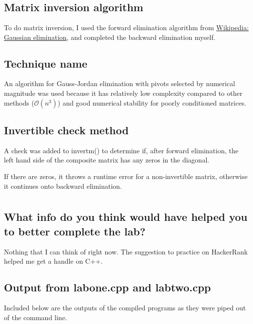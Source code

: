 \documentclass{article}
\begin{document}
\section{}
\subsection{Matrix inversion algorithm}
To do matrix inversion, I used the forward elimination algorithm from  \href{https://en.wikipedia.org/wiki/Gaussian_elimination#Pseudocode}{Wikipedia: Gaussian elimination}, and completed the backward elimination myself.
\subsection{Technique name}
An algorithm for Gauss-Jordan elimination with pivots selected by numerical magnitude was used because it has relatively low complexity compared to other methods ($\mathcal{O}(n^3)$) and good numerical stability for poorly conditioned matrices.
\subsection{Invertible check method}
A check was added to invertm() to determine if, after forward elimination, the left hand side of the composite matrix has any zeros in the diagonal.

If there are zeros, it throws a runtime error for a non-invertible matrix, otherwise it continues onto backward elimination.

\section{}
\subsection{What info do you think would have helped you to better complete the lab?}
Nothing that I can think of right now. The suggestion to practice on HackerRank helped me get a handle on C++.

\subsection{Output from labone.cpp and labtwo.cpp}
Included below are the outputs of the compiled programs as they were piped out of the command line.



\end{document}

